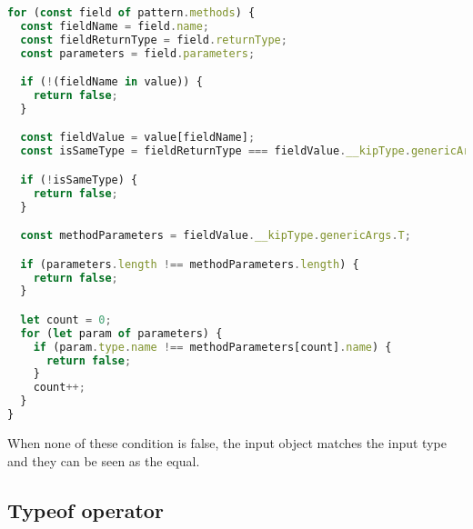 \begin{lstlisting}[language=Typescript,caption=Matches operator method comparison,label=lst:implementation:matchesmethod]
for (const field of pattern.methods) {
  const fieldName = field.name;
  const fieldReturnType = field.returnType;
  const parameters = field.parameters;

  if (!(fieldName in value)) {
    return false;
  }

  const fieldValue = value[fieldName];
  const isSameType = fieldReturnType === fieldValue.__kipType.genericArgs.R;

  if (!isSameType) {
    return false;
  }

  const methodParameters = fieldValue.__kipType.genericArgs.T;

  if (parameters.length !== methodParameters.length) {
    return false;
  }

  let count = 0;
  for (let param of parameters) {
    if (param.type.name !== methodParameters[count].name) {
      return false;
    }
    count++;
  }
}
\end{lstlisting}

When none of these condition is false, the input object matches the input type and they can be seen as the equal.

\subsection{Typeof operator}
\label{subsec:typeof}


